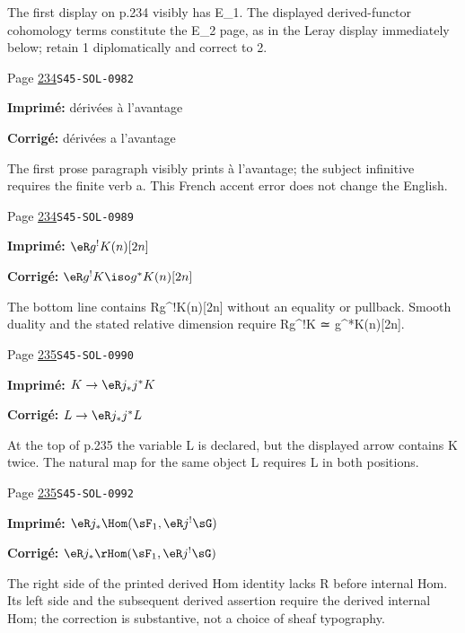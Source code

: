 \begin{description}
\par\noindent The first display on p.234 visibly has E\_1. The displayed derived-functor cohomology terms constitute the E\_2 page, as in the Leray display immediately below; retain 1 diplomatically and correct to 2.
\smallskip
\item[\hypertarget{apparatus:FR-0245}{245}] Page \hyperlink{printpage:fr:234}{234}\quad\texttt{S45-SOL-0982}
\par\noindent\textbf{Imprimé:} dérivées à l'avantage
\par\noindent\textbf{Corrigé:} dérivées a l'avantage
\par\noindent The first prose paragraph visibly prints à l’avantage; the subject infinitive requires the finite verb a. This French accent error does not change the English.
\smallskip
\item[\hypertarget{apparatus:FR-0246}{246}] Page \hyperlink{printpage:fr:234}{234}\quad\texttt{S45-SOL-0989}
\par\noindent\textbf{Imprimé:} \(\eR g^! K(n)[2 n]\)
\par\noindent\textbf{Corrigé:} \(\eR g^! K \iso g^\ast K(n)[2 n]\)
\par\noindent The bottom line contains Rg\textasciicircum{}!K(n)[2n] without an equality or pullback. Smooth duality and the stated relative dimension require Rg\textasciicircum{}!K ≃ g\textasciicircum{}*K(n)[2n].
\smallskip
\item[\hypertarget{apparatus:FR-0247}{247}] Page \hyperlink{printpage:fr:235}{235}\quad\texttt{S45-SOL-0990}
\par\noindent\textbf{Imprimé:} \(K\to \eR j_\ast j^\ast K\)
\par\noindent\textbf{Corrigé:} \(L\to \eR j_\ast j^\ast L\)
\par\noindent At the top of p.235 the variable L is declared, but the displayed arrow contains K twice. The natural map for the same object L requires L in both positions.
\smallskip
\item[\hypertarget{apparatus:FR-0248}{248}] Page \hyperlink{printpage:fr:235}{235}\quad\texttt{S45-SOL-0992}
\par\noindent\textbf{Imprimé:} \(\eR j_\ast \Hom(\sF_1,\eR j^! \sG)\)
\par\noindent\textbf{Corrigé:} \(\eR j_\ast \rHom(\sF_1,\eR j^! \sG)\)
\par\noindent The right side of the printed derived Hom identity lacks R before internal Hom. Its left side and the subsequent derived assertion require the derived internal Hom; the correction is substantive, not a choice of sheaf typography.

\end{description}
